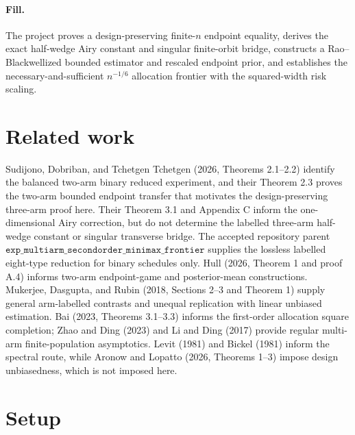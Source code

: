 \documentclass{article}
\begin{document}
\paragraph{Fill.} The project proves a design-preserving finite-\(n\) endpoint equality, derives the exact half-wedge Airy constant and singular finite-orbit bridge, constructs a Rao--Blackwellized bounded estimator and rescaled endpoint prior, and establishes the necessary-and-sufficient \(n^{-1/6}\) allocation frontier with the squared-width risk scaling.

\section{Related work}

Sudijono, Dobriban, and Tchetgen Tchetgen (2026, Theorems 2.1--2.2) identify the balanced two-arm binary reduced experiment, and their Theorem 2.3 proves the two-arm bounded endpoint transfer that motivates the design-preserving three-arm proof here. Their Theorem 3.1 and Appendix C inform the one-dimensional Airy correction, but do not determine the labelled three-arm half-wedge constant or singular transverse bridge. The accepted repository parent \(\texttt{exp\_multiarm\_secondorder\_minimax\_frontier}\) supplies the lossless labelled eight-type reduction for binary schedules only. Hull (2026, Theorem 1 and proof A.4) informs two-arm endpoint-game and posterior-mean constructions. Mukerjee, Dasgupta, and Rubin (2018, Sections 2--3 and Theorem 1) supply general arm-labelled contrasts and unequal replication with linear unbiased estimation. Bai (2023, Theorems 3.1--3.3) informs the first-order allocation square completion; Zhao and Ding (2023) and Li and Ding (2017) provide regular multi-arm finite-population asymptotics. Levit (1981) and Bickel (1981) inform the spectral route, while Aronow and Lopatto (2026, Theorems 1--3) impose design unbiasedness, which is not imposed here.

\section{Setup}
\end{document}
